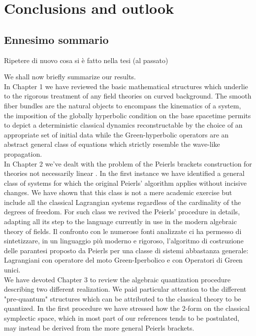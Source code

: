 \documentclass[Main]{subfiles}
\begin{document}
\chapter*{Conclusions and outlook}
\ifToninus
\section{Ennesimo sommario}
	Ripetere di nuovo cosa si è fatto nella tesi (al passato)
		
\fi
We shall now briefly summarize our results.
\\
In Chapter 1 we have reviewed the basic mathematical structures which underlie to the rigorous treatment of any field theories on curved background. The smooth fiber bundles are the natural objects to encompass the kinematics of a system, the imposition of the globally hyperbolic condition on the base spacetime permits to depict a deterministic classical dynamics reconstructable  by the choice of an appropriate set of initial data while the Green-hyperbolic operators are an abstract general class of equations which strictly resemble the wave-like propagation.
\\
In Chapter 2 we've dealt with the problem of the Peierls brackets construction for theories not necessarily linear .
In the first instance we have identified a general class of systems for which the original Peierls' algorithm applies without incisive changes. We have shown that this class is not a mere academic exercise but include all the classical Lagrangian systems regardless of the cardinality of the degrees of freedom.
For such class we revived the Peierls' procedure in details, adapting all its step to the language currently in use in the modern algebraic theory of fields.
\ifToninus
	Il confronto con le numerose fonti analizzate ci ha permesso di sintetizzare, in un linguaggio più moderno e rigoroso,  l'algoritmo  di costruzione  delle parantesi proposto da Peierls per una classe di sistemi abbastanza generale: Lagrangiani con operatore del moto Green-Iperbolico e con Operatori di Green unici.
\fi
\\
We have devoted Chapter 3 to review the algebraic quantization procedure describing two different realization.
We paid particular attention to the different "pre-quantum" structures which can be attributed to the classical theory to be quantized.
In the first procedure we have stressed how the 2-form on the classical symplectic space, which in most part of our references tends to be postulated, may instead be derived from the more general Peierls brackets.
\end{document}
